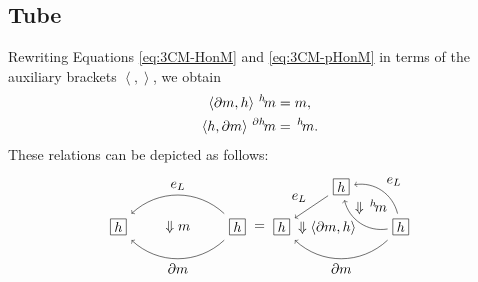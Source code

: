 \documentclass[11pt, reqno]{amsart} %
\newcommand{\act}[1]{\,\sp{#1}\!}
\newcommand{\strrect}[3][]{
  \begin{scope}[every node/.append style={overlay},#1]
    \foreach \x [count=\i] in {#3}{
      \ifx\x\empty
      \else
        \pgfmathsetmacro{\modResult}{mod(\i-1, #2)}
        \pgfmathsetmacro{\quotResult}{(\i-\modResult-1)/#2}
        \node at (\modResult,-\quotResult) {\x};
      \fi
    }
    \foreach \x in {0,1,...,#2}{
      \draw ({-1/2+\x},{1/2})--({-1/2+\x},{-#2+1/2});
      \draw ({-1/2},{1/2-\x})--({#2-1/2},{1/2-\x});
    }
  \end{scope}
}
\theoremstyle{definition}
\theoremstyle{remark}
\numberwithin{equation}{section}
\begin{document}
\subsection{Tube}
Rewriting Equations \eqref{eq:3CM-HonM} and \eqref{eq:3CM-pHonM} in terms of the auxiliary brackets $\left<,\right>$, we obtain
\begin{align}
  \label{eq:3CM-aux-HonM}
  \left<\partial m,h\right>\act{h}m &= m, \\
  \label{eq:3CM-aux-pHonM}
  \left<h,\partial m\right>\act{\partial h}m &= \act{h}m.
\end{align}
These relations can be depicted as follows:
\[
  \begin{tikzpicture}[baseline=-2pt]
    \node (A) at (1.5,0) {\tikz[baseline=-2pt,scale=.4]{\strrect{1}{$h$}}};
    \node (B) at (-1.5,0) {\tikz[baseline=-2pt,scale=.4]{\strrect{1}{$h$}}};
    \draw[->,bend right=1.5cm] (A.north west) to node [anchor=south] (C) {$e_L$} (B.north east);
    \draw[->,bend left=1.5cm] (A.south west) to node [anchor=north] (D) {$\partial m$} (B.south east);
    \path (C) to node {$\Downarrow m$} (D);
  \end{tikzpicture}
  =
  \begin{tikzpicture}[baseline=-2pt]
    \node (A) at (1.5,0) {\tikz[baseline=-2pt,scale=.4]{\strrect{1}{$h$}}};
    \node (B) at (0,1) {\tikz[baseline=-2pt,scale=.4]{\strrect{1}{$h$}}};
    \node (C) at (-1.5,0) {\tikz[baseline=-2pt,scale=.4]{\strrect{1}{$h$}}};
    \draw[->,bend right=1.5cm] (A) to coordinate (D) (B);
    \draw[->,bend left=1.5cm] (A) to coordinate (E) (B);
    \node [anchor=south west] at (D) {$e_L$};
    \path (D) to node {$\Downarrow \act{h}m$} (E);
    \draw [->] (B) to node [anchor=south east] {$e_L$} (C);
    \draw[->,bend left=1.5cm] (A.south west) to node [anchor=north] (D) {$\partial m$} (C.south east);
    \path (B.west) to node {$\Downarrow \left<\partial m,h\right>$} (D.west);
  \end{tikzpicture}
\]
\end{document}
